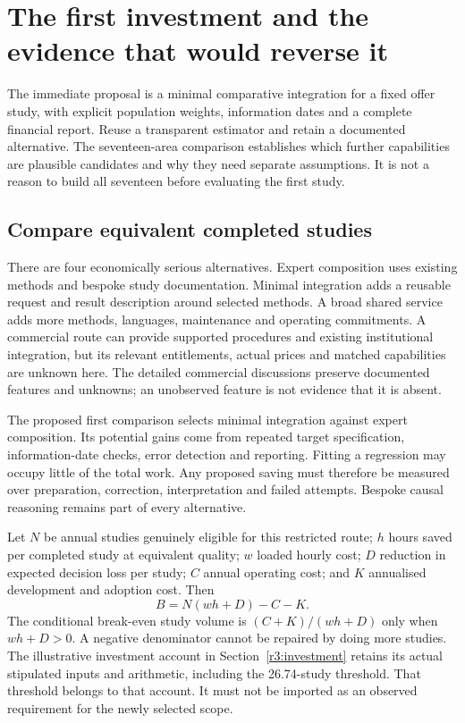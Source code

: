 \chapter{The first investment and the evidence that would reverse it}
\label{rewrite:investment-decision}

The immediate proposal is a minimal comparative integration for a fixed
offer study, with explicit population weights, information dates and
a complete financial report. Reuse a transparent estimator and retain
a documented alternative. The seventeen-area comparison establishes
which further capabilities are plausible candidates and why they need
separate assumptions. It is not a reason to build all seventeen before
evaluating the first study.

\section{Compare equivalent completed studies}
There are four economically serious alternatives. Expert composition
uses existing methods and bespoke study documentation. Minimal integration
adds a reusable request and result description around selected methods.
A broad shared service adds more methods, languages, maintenance and
operating commitments. A commercial route can provide supported
procedures and existing institutional integration, but its relevant
entitlements, actual prices and matched capabilities are unknown here.
The detailed commercial discussions preserve documented features and
unknowns; an unobserved feature is not evidence that it is absent.

The proposed first comparison selects minimal integration against expert
composition. Its potential gains come from repeated target specification,
information-date checks, error detection and reporting. Fitting a regression
may occupy little of the total work. Any proposed saving must therefore
be measured over preparation, correction, interpretation and failed
attempts. Bespoke causal reasoning remains part of every alternative.

Let $N$ be annual studies genuinely eligible for this restricted route;
$h$ hours saved per completed study at equivalent quality; $w$ loaded
hourly cost; $D$ reduction in expected decision loss per study; $C$ annual
operating cost; and $K$ annualised development and adoption cost. Then
\[
 B=N(wh+D)-C-K.
\]
The conditional break-even study volume is $(C+K)/(wh+D)$ only when
$wh+D>0$. A negative denominator cannot be repaired by doing more studies.
The illustrative investment account in Section~\ref{r3:investment}
retains its actual stipulated inputs and arithmetic, including the
26.74-study threshold. That threshold belongs to that account. It must
not be imported as an observed requirement for the newly selected scope.

